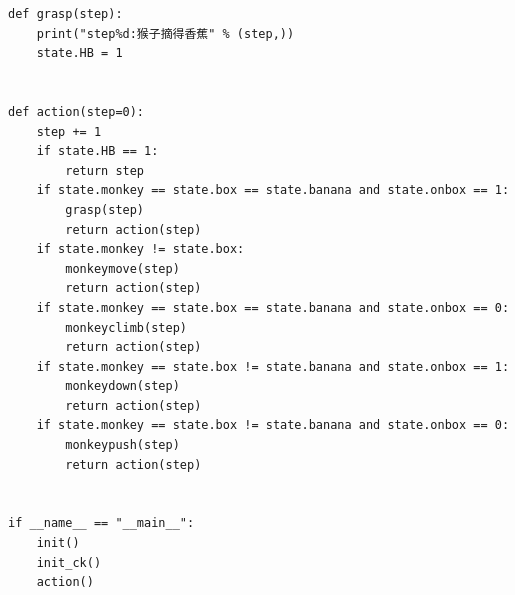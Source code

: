 \begin{lstlisting}
def grasp(step):
    print("step%d:猴子摘得香蕉" % (step,))
    state.HB = 1


def action(step=0):
    step += 1
    if state.HB == 1:
        return step
    if state.monkey == state.box == state.banana and state.onbox == 1:
        grasp(step)
        return action(step)
    if state.monkey != state.box:
        monkeymove(step)
        return action(step)
    if state.monkey == state.box == state.banana and state.onbox == 0:
        monkeyclimb(step)
        return action(step)
    if state.monkey == state.box != state.banana and state.onbox == 1:
        monkeydown(step)
        return action(step)
    if state.monkey == state.box != state.banana and state.onbox == 0:
        monkeypush(step)
        return action(step)


if __name__ == "__main__":
    init()
    init_ck()
    action()
\end{lstlisting}



